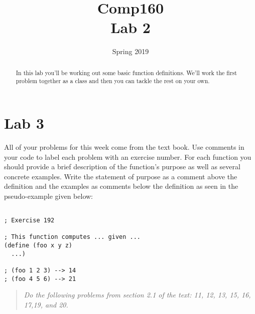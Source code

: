\documentclass[nobib]{tufte-handout}
\title{Comp160 \\ Lab 2 }
\author{}
\date{ Spring 2019 }
\begin{document}
\maketitle

\begin{abstract}
In this lab you'll be working out some basic function definitions.  We'll work the first problem together as a class and then you can tackle the rest on your own.
\end{abstract}

\section{Lab 3}

All of your problems for this week come from the text book. Use comments in your code to label each problem with an exercise number. For each function you should provide a brief description of the function's purpose as well as several concrete examples. Write the statement of purpose as a comment above the definition and the examples as comments below the definition as seen in the pseudo-example given below:

\begin{lstlisting}

; Exercise 192

; This function computes ... given ...
(define (foo x y z)
  ...)

; (foo 1 2 3) --> 14
; (foo 4 5 6) --> 21
\end{lstlisting}

\vspace{1in}

\begin{quote}
  \textit{
Do the following problems from section 2.1 of the text: 11, 12, 13, 15, 16, 17,19, and 20.
}
\end{quote}
\end{document}
